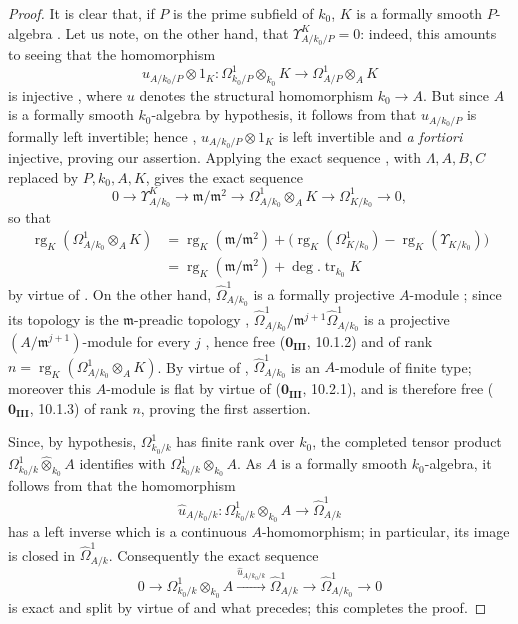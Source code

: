 \begin{proof}
It is clear that, if $P$ is the prime subfield of $k_0$, $K$ is a formally smooth $P$-algebra .
Let us note, on the other hand, that $\Upsilon^K_{A/k_0/P}=0$: indeed, this amounts to seeing that the homomorphism
\[
  u_{A/k_0/P}\otimes 1_K:\Omega^1_{k_0/P}\otimes_{k_0}K
  \longrightarrow\Omega^1_{A/P}\otimes_AK
\]
is injective , where $u$ denotes the structural homomorphism $k_0\to A$.
But since $A$ is a formally smooth $k_0$-algebra by hypothesis, it follows from  that $u_{A/k_0/P}$ is formally left invertible; hence , $u_{A/k_0/P}\otimes1_K$ is left invertible and \emph{a fortiori} injective, proving our assertion.
Applying the exact sequence , with $\Lambda,A,B,C$ replaced by $P,k_0,A,K$, gives the exact sequence
\[
  0\longrightarrow\Upsilon^K_{A/k_0}
  \longrightarrow\mathfrak{m}/\mathfrak{m}^2
  \longrightarrow\Omega^1_{A/k_0}\otimes_AK
  \longrightarrow\Omega^1_{K/k_0}\longrightarrow0,
\]
so that
\[
\begin{split}
  \operatorname{rg}_K(\Omega^1_{A/k_0}\otimes_AK)
  &={\operatorname{rg}}_K(\mathfrak{m}/\mathfrak{m}^2)
    +\bigl(\operatorname{rg}_K(\Omega^1_{K/k_0})
    -\operatorname{rg}_K(\Upsilon_{K/k_0})\bigr)\\
  &={\operatorname{rg}}_K(\mathfrak{m}/\mathfrak{m}^2)
    +\deg.\operatorname{tr}_{k_0}K
\end{split}
\]
by virtue of .
On the other hand, $\widehat{\Omega}^1_{A/k_0}$ is a formally projective $A$-module ; since its topology is the $\mathfrak{m}$-preadic topology ,
$\widehat{\Omega}^1_{A/k_0}/\mathfrak{m}^{j+1}\widehat{\Omega}^1_{A/k_0}$ is a projective $(A/\mathfrak{m}^{j+1})$-module for every $j$ , hence free ($\mathbf{0_{III}}$, 10.1.2) and of rank
$n=\operatorname{rg}_K(\Omega^1_{A/k_0}\otimes_AK)$.
By virtue of , $\widehat{\Omega}^1_{A/k_0}$ is an $A$-module of finite type; moreover this $A$-module is flat by virtue of ($\mathbf{0_{III}}$, 10.2.1), and is therefore free ($\mathbf{0_{III}}$, 10.1.3) of rank $n$, proving the first assertion.

Since, by hypothesis, $\Omega^1_{k_0/k}$ has finite rank over $k_0$, the completed tensor product $\Omega^1_{k_0/k}\widehat{\otimes}_{k_0}A$ identifies with $\Omega^1_{k_0/k}\otimes_{k_0}A$.
As $A$ is a formally smooth $k_0$-algebra, it follows from  that the homomorphism
\[
  \widehat{u}_{A/k_0/k}:\Omega^1_{k_0/k}\otimes_{k_0}A
  \longrightarrow\widehat{\Omega}^1_{A/k}
\]
has a left inverse which is a continuous $A$-homomorphism; in particular, its image is closed in $\widehat{\Omega}^1_{A/k}$.
Consequently the exact sequence
\[
  0\longrightarrow\Omega^1_{k_0/k}\otimes_{k_0}A
  \xrightarrow{\widehat{u}_{A/k_0/k}}\widehat{\Omega}^1_{A/k}
  \longrightarrow\widehat{\Omega}^1_{A/k_0}\longrightarrow0
\]
is exact and split by virtue of  and what precedes; this completes the proof.
\end{proof}

